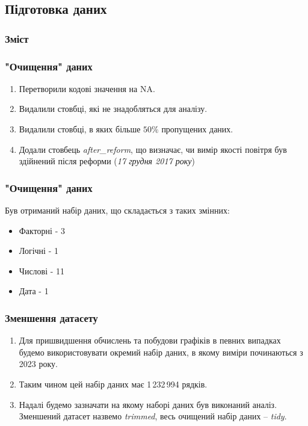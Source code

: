 \documentclass{beamer}
\begin{document}
\begin{frame}
  \section{Підготовка даних}

  \frametitle{Зміст}
  \tableofcontents[currentsection]
\end{frame}

\begin{frame}
  \frametitle{"Очищення" даних}

  \begin{enumerate}
    \item Перетворили кодові значення на NA.
    \item Видалили стовбці, які не знадобляться для аналізу.
    \item Видалили стовбці, в яких більше $50\%$ пропущених даних.
    \item Додали стовбець \textit{after\_reform}, що визначає, чи вимір
    якості повітря був здійнений після реформи (\textit{17 грудня 2017 року})
  \end{enumerate}
\end{frame}

\begin{frame}
  \frametitle{"Очищення" даних}

  Був отриманий набір даних, що складається з таких змінних:

  \begin{itemize}
    \item Факторні - 3
    \item Логічні - 1
    \item Числові - 11
    \item Дата - 1
  \end{itemize}
\end{frame}

\begin{frame}
  \frametitle{Зменшення датасету}

  \begin{enumerate}
    \item Для пришвидшення обчислень та побудови графіків в певних випадках будемо використовувати
    окремий набір даних, в якому виміри починаються з 2023 року.
    \item Таким чином цей набір даних має 1\,232\,994 рядків.
    \item Надалі будемо зазначати на якому наборі даних був виконаний аналіз. Зменшений
    датасет назвемо \textit{trimmed}, весь очищений набір даних -- \textit{tidy}.
  \end{enumerate}

\end{frame}
\end{document}
